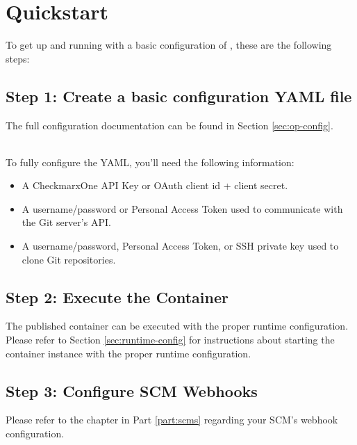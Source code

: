 \chapter{Quickstart}

To get up and running with a basic configuration of \cxoneflow, these are the following steps:


\section{Step 1: Create a basic configuration YAML file}

The full configuration documentation can be found in Section \ref{sec:op-config}. 

\noindent\\To fully configure the YAML, you'll need the following information:

\begin{itemize}
    \item A CheckmarxOne API Key or OAuth client id + client secret.
    \item A username/password or Personal Access Token used to communicate with the Git server's API.
    \item A username/password, Personal Access Token, or SSH private key used to clone Git repositories.
\end{itemize}


\section{Step 2: Execute the \cxoneflow Container}

The published \cxoneflow container can be executed with the proper runtime configuration.  Please refer
to Section \ref{sec:runtime-config} for instructions about starting the \cxoneflow container instance with
the proper runtime configuration.


\section{Step 3: Configure SCM Webhooks}

Please refer to the chapter in Part \ref{part:scms} regarding your SCM's webhook configuration.
